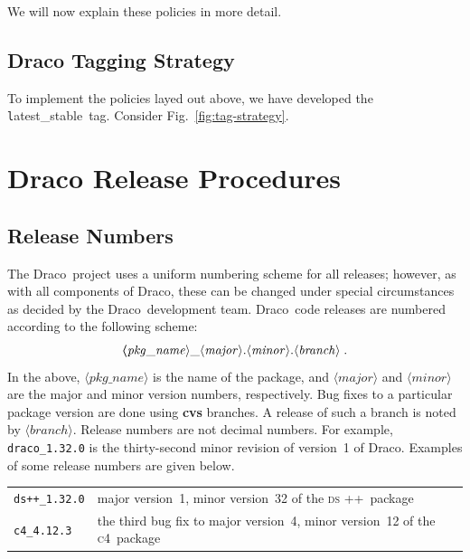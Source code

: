 \documentclass[11pt]{nmemo}
\newcommand{\draco}{{\normalfont\normalsize\textsf Draco}}
\newcommand{\cfour}{{\normalfont\normalsize\scshape c\small 4}}
\newcommand{\dsxx}{{\normalfont\normalsize\scshape ds\raisebox{.2ex}
  {\scriptsize ++}}}
\newcommand{\stable}{{\normalfont\normalsize\texttt latest\_stable}}
\begin{document}
We will now explain these policies in more detail.

\subsection{Draco Tagging Strategy}

To implement the policies layed out above, we have developed the
\stable\ tag.  Consider Fig.~\ref{fig:tag-strategy}.
 

\section{Draco Release Procedures}
\label{sec:procedures}

\subsection{Release Numbers}
\label{sec:rel_num}

The \draco\ project uses a uniform numbering scheme for all releases;
however, as with all components of \draco, these can be changed under
special circumstances as decided by the \draco\ development team.
\draco\ code releases are numbered according to the following scheme:
\begin{equation}
  \boldsymbol
  \langle\mathit{pkg\_name}\rangle\_
  \langle\mathit{major}\rangle.
  \langle\mathit{minor}\rangle.
  \langle\mathit{branch}\rangle\; .
  \notag
\end{equation}
In the above, $\langle\mathit{pkg\_name}\rangle$ is the name of the
package, and $\langle\mathit{major}\rangle$ and
$\langle\mathit{minor}\rangle$ are the major and minor version
numbers, respectively. Bug fixes to a particular package version are
done using {\bf cvs} branches.  A release of such a branch is noted by
$\langle\mathit{branch}\rangle$.  Release numbers are not decimal
numbers.  For example, \texttt{draco\_1.32.0} is the thirty-second
minor revision of version~1 of \draco.  Examples of some release
numbers are given below.
\begin{center}
  \begin{tabular}{ll}
    \texttt{ds++\_1.32.0} & major version~1, minor version~32 of the
    \dsxx\ package \\
    \texttt{c4\_4.12.3} & the third bug fix to major version~4, minor
    version~12 of the \cfour\ package \\
  \end{tabular}
\end{center}
\end{document}
